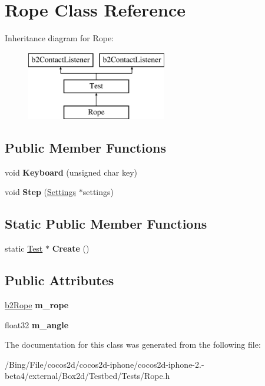 \hypertarget{class_rope}{\section{Rope Class Reference}
\label{class_rope}
}
Inheritance diagram for Rope\-:\begin{figure}[H]
\begin{center}
\leavevmode
\includegraphics[height=3.000000cm]{class_rope}
\end{center}
\end{figure}
\subsection*{Public Member Functions}
\begin{DoxyCompactItemize}
\item 
\hypertarget{class_rope_a3bc1d2384c45ba150c5ef3b6dc73044f}{void {\bfseries Keyboard} (unsigned char key)}\label{class_rope_a3bc1d2384c45ba150c5ef3b6dc73044f}

\item 
\hypertarget{class_rope_ab40c91248d1ef7ce4eee9997d8b6e276}{void {\bfseries Step} (\hyperlink{struct_settings}{Settings} $\ast$settings)}\label{class_rope_ab40c91248d1ef7ce4eee9997d8b6e276}

\end{DoxyCompactItemize}
\subsection*{Static Public Member Functions}
\begin{DoxyCompactItemize}
\item 
\hypertarget{class_rope_a4f65bcc07852ef02bc9d6b2d2a4d6261}{static \hyperlink{class_test}{Test} $\ast$ {\bfseries Create} ()}\label{class_rope_a4f65bcc07852ef02bc9d6b2d2a4d6261}

\end{DoxyCompactItemize}
\subsection*{Public Attributes}
\begin{DoxyCompactItemize}
\item 
\hypertarget{class_rope_abb90d6d8c8796019d3d5422b8a74b669}{\hyperlink{classb2_rope}{b2\-Rope} {\bfseries m\-\_\-rope}}\label{class_rope_abb90d6d8c8796019d3d5422b8a74b669}

\item 
\hypertarget{class_rope_a9d6441446f364f1255efa0d649c5e808}{float32 {\bfseries m\-\_\-angle}}\label{class_rope_a9d6441446f364f1255efa0d649c5e808}

\end{DoxyCompactItemize}


The documentation for this class was generated from the following file\-:\begin{DoxyCompactItemize}
\item 
/\-Bing/\-File/cocos2d/cocos2d-\/iphone/cocos2d-\/iphone-\/2.-\/beta4/external/\-Box2d/\-Testbed/\-Tests/Rope.\-h\end{DoxyCompactItemize}
